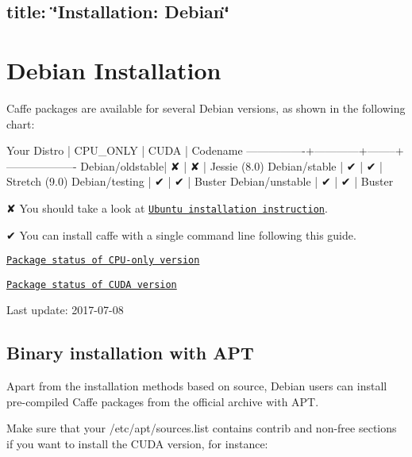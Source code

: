 

 \subsection*{title\+: \char`\"{}\+Installation\+: Debian\char`\"{} }

\section*{Debian Installation}

Caffe packages are available for several Debian versions, as shown in the following chart\+:


\begin{DoxyCode}
Your Distro     |  CPU\_ONLY  |  CUDA  | Codename
----------------+------------+--------+-------------------
Debian/oldstable|     ✘      |   ✘    | Jessie (8.0)
Debian/stable   |     ✔      |   ✔    | Stretch (9.0)
Debian/testing  |     ✔      |   ✔    | Buster
Debian/unstable |     ✔      |   ✔    | Buster
\end{DoxyCode}



\begin{DoxyItemize}
\item {\ttfamily ✘} You should take a look at \href{install_apt.html}{\tt Ubuntu installation instruction}.
\item {\ttfamily ✔} You can install caffe with a single command line following this guide.
\item \href{https://tracker.debian.org/pkg/caffe}{\tt Package status of C\+P\+U-\/only version}
\item \href{https://tracker.debian.org/pkg/caffe-contrib}{\tt Package status of C\+U\+DA version}
\end{DoxyItemize}

Last update\+: 2017-\/07-\/08

\subsection*{Binary installation with A\+PT}

Apart from the installation methods based on source, Debian users can install pre-\/compiled Caffe packages from the official archive with A\+PT.

Make sure that your {\ttfamily /etc/apt/sources.list} contains {\ttfamily contrib} and {\ttfamily non-\/free} sections if you want to install the C\+U\+DA version, for instance\+:


